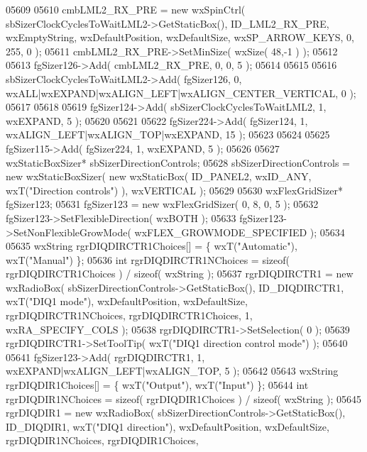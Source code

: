 \begin{DoxyCode}
05609     
05610     cmbLML2_RX_PRE = \textcolor{keyword}{new} wxSpinCtrl( sbSizerClockCyclesToWaitLML2->GetStaticBox(), 
      ID_LML2_RX_PRE, wxEmptyString, wxDefaultPosition, wxDefaultSize, wxSP\_ARROW\_KEYS, 0, 255, 0 );
05611     cmbLML2_RX_PRE->SetMinSize( wxSize( 48,-1 ) );
05612     
05613     fgSizer126->Add( cmbLML2_RX_PRE, 0, 0, 5 );
05614     
05615     
05616     sbSizerClockCyclesToWaitLML2->Add( fgSizer126, 0, wxALL|wxEXPAND|wxALIGN\_LEFT|wxALIGN\_CENTER\_VERTICAL, 
      0 );
05617     
05618     
05619     fgSizer124->Add( sbSizerClockCyclesToWaitLML2, 1, wxEXPAND, 5 );
05620     
05621     
05622     fgSizer224->Add( fgSizer124, 1, wxALIGN\_LEFT|wxALIGN\_TOP|wxEXPAND, 15 );
05623     
05624     
05625     fgSizer115->Add( fgSizer224, 1, wxEXPAND, 5 );
05626     
05627     wxStaticBoxSizer* sbSizerDirectionControls;
05628     sbSizerDirectionControls = \textcolor{keyword}{new} wxStaticBoxSizer( \textcolor{keyword}{new} wxStaticBox( ID_PANEL2, wxID\_ANY, wxT(\textcolor{stringliteral}{"Direction
       controls"}) ), wxVERTICAL );
05629     
05630     wxFlexGridSizer* fgSizer123;
05631     fgSizer123 = \textcolor{keyword}{new} wxFlexGridSizer( 0, 8, 0, 5 );
05632     fgSizer123->SetFlexibleDirection( wxBOTH );
05633     fgSizer123->SetNonFlexibleGrowMode( wxFLEX\_GROWMODE\_SPECIFIED );
05634     
05635     wxString rgrDIQDIRCTR1Choices[] = \{ wxT(\textcolor{stringliteral}{"Automatic"}), wxT(\textcolor{stringliteral}{"Manual"}) \};
05636     \textcolor{keywordtype}{int} rgrDIQDIRCTR1NChoices = \textcolor{keyword}{sizeof}( rgrDIQDIRCTR1Choices ) / \textcolor{keyword}{sizeof}( wxString );
05637     rgrDIQDIRCTR1 = \textcolor{keyword}{new} wxRadioBox( sbSizerDirectionControls->GetStaticBox(), 
      ID_DIQDIRCTR1, wxT(\textcolor{stringliteral}{"DIQ1 mode"}), wxDefaultPosition, wxDefaultSize, rgrDIQDIRCTR1NChoices, 
      rgrDIQDIRCTR1Choices, 1, wxRA\_SPECIFY\_COLS );
05638     rgrDIQDIRCTR1->SetSelection( 0 );
05639     rgrDIQDIRCTR1->SetToolTip( wxT(\textcolor{stringliteral}{"DIQ1 direction control mode"}) );
05640     
05641     fgSizer123->Add( rgrDIQDIRCTR1, 1, wxEXPAND|wxALIGN\_LEFT|wxALIGN\_TOP, 5 );
05642     
05643     wxString rgrDIQDIR1Choices[] = \{ wxT(\textcolor{stringliteral}{"Output"}), wxT(\textcolor{stringliteral}{"Input"}) \};
05644     \textcolor{keywordtype}{int} rgrDIQDIR1NChoices = \textcolor{keyword}{sizeof}( rgrDIQDIR1Choices ) / \textcolor{keyword}{sizeof}( wxString );
05645     rgrDIQDIR1 = \textcolor{keyword}{new} wxRadioBox( sbSizerDirectionControls->GetStaticBox(), 
      ID_DIQDIR1, wxT(\textcolor{stringliteral}{"DIQ1 direction"}), wxDefaultPosition, wxDefaultSize, rgrDIQDIR1NChoices, rgrDIQDIR1Choices,

\end{DoxyCode}
